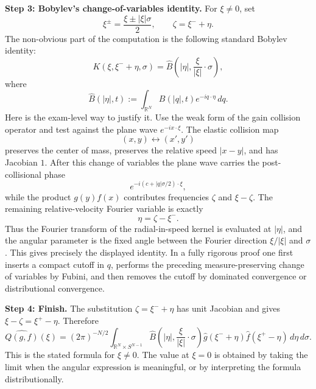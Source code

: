 \begin{solution}
\par\vspace{\baselineskip}
\textbf{Step 3: Bobylev's change-of-variables identity.}
For $\xi\neq0$, set
\[
\xi^\pm=\frac{\xi\pm|\xi|\sigma}{2},
\qquad
\zeta=\xi^-+\eta.
\]
The non-obvious part of the computation is the following standard Bobylev identity:
\[
K(\xi,\xi^-+\eta,\sigma)
=
\hat B\left(|\eta|,\frac{\xi}{|\xi|}\cdot\sigma\right),
\]
where
\[
\hat B(|\eta|,t)
:=
\int_{\mathbb{R}^N}B(|q|,t)e^{-iq\cdot\eta}\,dq.
\]
Here is the exam-level way to justify it.  Use the weak form of the gain collision operator and test against the plane wave $e^{-ix\cdot\xi}$.  The elastic collision map
\[
(x,y)\longleftrightarrow (x',y')
\]
preserves the center of mass, preserves the relative speed $|x-y|$, and has Jacobian $1$.  After this change of variables the plane wave carries the post-collisional phase
\[
e^{-i(c+|q|\sigma/2)\cdot\xi},
\]
while the product $g(y)f(x)$ contributes frequencies $\zeta$ and $\xi-\zeta$.  The remaining relative-velocity Fourier variable is exactly
\[
\eta=\zeta-\xi^-.
\]
Thus the Fourier transform of the radial-in-speed kernel is evaluated at $|\eta|$, and the angular parameter is the fixed angle between the Fourier direction $\xi/|\xi|$ and $\sigma$.  This gives precisely the displayed identity.  In a fully rigorous proof one first inserts a compact cutoff in $q$, performs the preceding measure-preserving change of variables by Fubini, and then removes the cutoff by dominated convergence or distributional convergence.

\par\vspace{\baselineskip}
\textbf{Step 4: Finish.}
The substitution $\zeta=\xi^-+\eta$ has unit Jacobian and gives $\xi-\zeta=\xi^+-\eta$.  Therefore
\[
\widehat{Q(g,f)}(\xi)
=(2\pi)^{-N/2}
\int_{\mathbb{R}^N\times S^{N-1}}
\hat B\left(|\eta|,\frac{\xi}{|\xi|}\cdot\sigma\right)
\hat g(\xi^-+\eta)\hat f(\xi^+-\eta)
\,d\eta\,d\sigma.
\]
This is the stated formula for $\xi\neq0$.  The value at $\xi=0$ is obtained by taking the limit when the angular expression is meaningful, or by interpreting the formula distributionally.
\end{solution}
